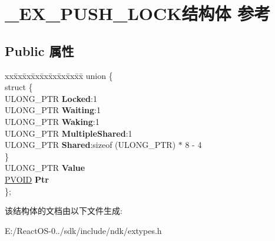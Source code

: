 \hypertarget{struct___e_x___p_u_s_h___l_o_c_k}{}\section{\+\_\+\+E\+X\+\_\+\+P\+U\+S\+H\+\_\+\+L\+O\+C\+K结构体 参考}
\label{struct___e_x___p_u_s_h___l_o_c_k}
\subsection*{Public 属性}
\begin{DoxyCompactItemize}
\item 
\mbox{\label{struct___e_x___p_u_s_h___l_o_c_k_a6840ae6ae219490c81025b5fc778db28}} 
\begin{tabbing}
xx\=xx\=xx\=xx\=xx\=xx\=xx\=xx\=xx\=\kill
union \{\\
\mbox{\label{union___e_x___p_u_s_h___l_o_c_k_1_1_0D1996_aa53999e025ee49153dbbdcdc335f93d6}} 
\>struct \{\\
\>\>ULONG\_PTR {\bfseries Locked}:1\\
\>\>ULONG\_PTR {\bfseries Waiting}:1\\
\>\>ULONG\_PTR {\bfseries Waking}:1\\
\>\>ULONG\_PTR {\bfseries MultipleShared}:1\\
\>\>ULONG\_PTR {\bfseries Shared}:sizeof (ULONG\_PTR) $\ast$ 8 -\/ 4\\
\>\} \\
\>ULONG\_PTR {\bfseries Value}\\
\>\hyperlink{interfacevoid}{PVOID} {\bfseries Ptr}\\
\}; \\

\end{tabbing}\end{DoxyCompactItemize}


该结构体的文档由以下文件生成\+:\begin{DoxyCompactItemize}
\item 
E\+:/\+React\+O\+S-\/0../sdk/include/ndk/extypes.\+h\end{DoxyCompactItemize}
